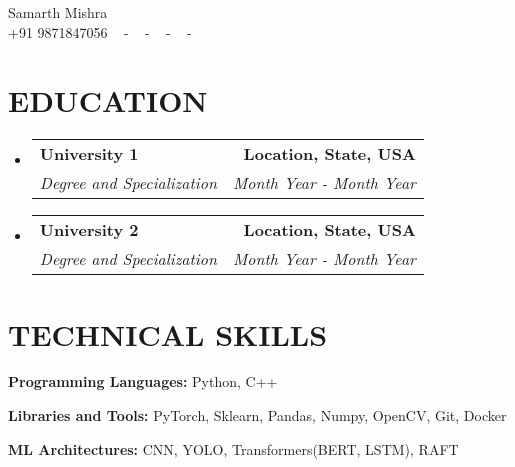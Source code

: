 \documentclass[letterpaper,11pt]{article}
\makeatletter
\newcommand{\resumeSubheading}[4]{
  \vspace{-2pt}\item
    \begin{tabular*}{1.0\textwidth}[t]{l@{\extracolsep{\fill}}r}
      \textbf{\large#1} & \textbf{\small #2} \\
      \textit{\large#3} & \textit{\small #4} \\
      
    \end{tabular*}\vspace{-7pt}
}
\newcommand{\resumeSubHeadingListStart}{\begin{itemize}[leftmargin=0.0in, label={}]}
\newcommand{\resumeSubHeadingListEnd}{\end{itemize}}
\makeatother
\begin{document}


\begin{center}
    {\huge Samarth Mishra} \\ \vspace{2pt} 
    {+91 9871847056} ~ 
    \small{-}
    \href{[url to portfolio]}{\color{blue}{Portfolio}} ~ 
    \small{-}
    \href{mailto:samarthmishra373@gmail.com}{\color{blue}{samarthmishra373@gmail.com@gmail.com}} ~ 
    \small{-}
    \href{https://www.linkedin.com/in/samarth-mishra-440389133/}{ \color{blue}{linkedin.com/in/Samarth mishra}}  ~
    \small{-}
    \href{[url to github profile]}{ \color{blue}{github.com/username}} ~
    \vspace{-7pt}
\end{center}

\section{\color{airforceblue}EDUCATION}
  \resumeSubHeadingListStart
    \resumeSubheading
      {University 1}{Location, State, USA}
      {Degree and Specialization}{Month Year - Month Year}
    \vspace{-4pt}
     \resumeSubheading
      {University 2}{Location, State, USA}
      {Degree and Specialization}{Month Year - Month Year}
  \resumeSubHeadingListEnd
  \vspace{-10pt}

\section{\color{airforceblue}TECHNICAL SKILLS}
 \begin{itemize}[leftmargin=0in, label={}]
    \small{\item{
     \textbf{\normalsize{Programming Languages:}}{ \normalsize{Python, C++}} \\
      \vspace{1.2pt}
      
     \textbf{\normalsize{Libraries and Tools:}}{ \normalsize{PyTorch,  Sklearn, Pandas, Numpy, OpenCV, Git, Docker}} \\
      \vspace{1.2pt}
      
     \textbf{\normalsize{ML Architectures:}}{ \normalsize{CNN, YOLO, Transformers(BERT, LSTM), RAFT}}

     }}
 \end{itemize}
 \vspace{-16pt}
 
\end{document}
